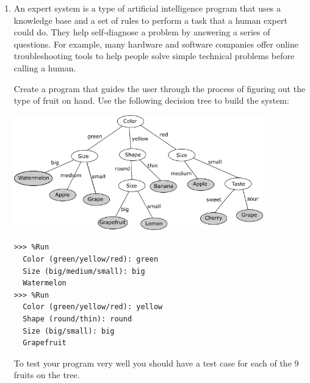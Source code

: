 \documentclass[
  fontsize=10pt,
  a4paper,
]{scrartcl}
\newenvironment{howTILEd}%
  {\begin{mdframed}[skipabove=10pt,skipbelow=10pt,backgroundcolor=pink!40]}%
  {\end{mdframed}}
\begin{document}
\begin{enumerate}
What other tests have you run to ensure that your program has the desired behaviour?

Have you tried ages that lead to different behaviours? Try with the test cases ({\tt age $\le$ 25}), ({\tt age $\ge$ 25}) and also when the age is exactly 25, a value located between the two behaviour intervals.

Have you tested your program for all possible ranges of years that the user can have the license? For example, the test cases for the years intervals {\tt [0, 3[}, {\tt [3, 5[} and {\tt [5, 10]}.

Have you tested your program with all possible values for the number of accidents?

And how about different combinations of the cases mentioned above?

\begin{howTILEd}
Insist that the students test their programs by giving them example test executions. Moreover, guide them through a thinking process of what else needs to be tested.
\end{howTILEd}


\item An expert system is a type of artificial intelligence program that uses a knowledge base and a set of rules to perform a task that a human expert could do. They help self-diagnose a problem by answering a series of questions. For example, many hardware and software companies offer online troubleshooting tools to help people solve simple technical problems before calling a human.

Create a program that guides the user through the process of figuring out the type of fruit on hand. Use the following decision tree to build the system: 

\includegraphics[width=0.85\textwidth]{images/tree.png}

\begin{small}
\begin{Verbatim}[frame=single, label={\em examples of test executions}]
>>> %Run 
  Color (green/yellow/red): green
  Size (big/medium/small): big
  Watermelon
>>> %Run 
  Color (green/yellow/red): yellow
  Shape (round/thin): round
  Size (big/small): big
  Grapefruit
\end{Verbatim}
\end{small}
To test your program very well you should have a test case for each of the 9 fruits on the tree.


\end{enumerate}
\end{document}
